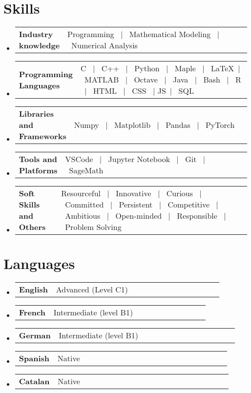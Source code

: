 \documentclass[a4paper,11pt]{article}
\makeatletter
\newcommand{\resumeSectionTypeOne}[2]{
  \item\begin{tabular*}{0.99\textwidth}[t]{
    p{0.18\linewidth}p{0.81\linewidth}
  }
  \textbf{#1} & #2
  \end{tabular*}\vspace{-2pt}
}
\newcommand{\resumeQuadHeading}[4]{
  \item
  \begin{tabular*}{0.96\textwidth}[t]{l@{\extracolsep{\fill}}r}
    \textbf{#1} & \small #2 \\
    \small#3 & \small #4 \\
  \end{tabular*}
}
\newcommand{\resumeHeadingListStart}{
  \begin{itemize}[leftmargin=0.15in, label={}]
}
\newcommand{\resumeHeadingListEnd}{\end{itemize}}
\makeatother
\begin{document}




\section{Skills}
\resumeHeadingListStart{}
\resumeSectionTypeOne{Industry knowledge}{Programming \ $|$ \ Mathematical Modeling \ $|$ \ Numerical Analysis}
\resumeHeadingListEnd{}

\resumeHeadingListStart{}
\resumeSectionTypeOne{Programming Languages}{C \ $|$ \ C++ \ $|$ \ Python \ $|$ \ Maple \ $|$ \ \LaTeX \ $|$ \ MATLAB \ $|$ \ Octave \ $|$ \ Java \ $|$ \ Bash \ $|$ \ R \ $|$ \ HTML \ $|$ \ CSS \ $|$ JS\ $|$ \ SQL}
\resumeHeadingListEnd{}

\resumeHeadingListStart{}
\resumeSectionTypeOne{Libraries and Frameworks}{Numpy \ $|$ \ Matplotlib \ $|$ \ Pandas \ $|$ \ PyTorch}
\resumeHeadingListEnd{}

\resumeHeadingListStart{}
\resumeSectionTypeOne{Tools and Platforms}{VSCode \ $|$ \  Jupyter Notebook \ $|$ \ Git \ $|$ \ SageMath}
\resumeHeadingListEnd{}

\resumeHeadingListStart{}
\resumeSectionTypeOne{Soft Skills and Others}{Resourceful \ $|$ \ Innovative \ $|$ \ Curious \ $|$ \ Committed \ $|$ \ Persistent \ $|$ \ Competitive \ $|$ \ Ambitious \ $|$ \ Open-minded \ $|$ \ Responsible \ $|$ \ Problem Solving}
\resumeHeadingListEnd{}

\section{Languages}
\resumeHeadingListStart{}
\resumeSectionTypeOne{English}{Advanced (Level C1)}
\resumeSectionTypeOne{French}{Intermediate (level B1)}
\resumeSectionTypeOne{German}{Intermediate (level B1)}
\resumeSectionTypeOne{Spanish}{Native}
\resumeSectionTypeOne{Catalan}{Native}
\resumeHeadingListEnd{}
\end{document}
